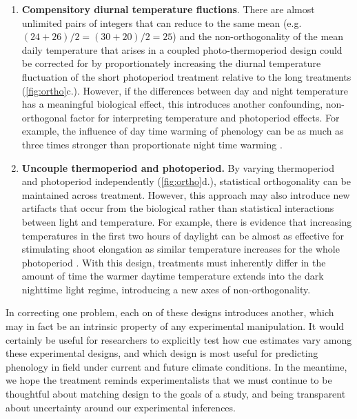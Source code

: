 \documentclass[11pt]{article}
\begin{document}
{\begin{enumerate}
\item \textbf{Compensitory diurnal temperature fluctions}. There are almost unlimited pairs of integers that can reduce to the same mean (e.g. $(24+26)/2 = (30+20)/2 = 25$) and the non-orthogonality of the mean daily temperature that arises in a coupled photo-thermoperiod design could be corrected for by proportionately increasing the diurnal temperature fluctuation of the short photoperiod treatment relative to the long treatments (\ref{fig:ortho}c.). However, if the differences between day and night temperature has a meaningful biological effect, this introduces another confounding, non-orthogonal factor for interpreting temperature and photoperiod effects. For example, the influence of day time warming of phenology can be as much as three times stronger than proportionate night time warming \citep{Rossi2017,Meng:2020ui}.

\item \textbf{Uncouple thermoperiod and photoperiod.} By varying thermoperiod and photoperiod independently (\ref{fig:ortho}d.), statistical orthogonality can be maintained across treatment. However, this approach may also introduce new artifacts that occur from the biological rather than statistical interactions between light and temperature. For example, there is evidence that increasing temperatures in the first two hours of daylight can be almost as effective for stimulating shoot elongation as similar temperature increases for the whole photoperiod \citep{Erwin1998}. With this design, treatments must inherently differ in the amount of time the warmer daytime temperature extends into the dark nighttime light regime, introducing a new axes of non-orthogonality.
\end{enumerate}

In correcting one problem, each on of these designs introduces another, which may in fact be an intrinsic property of any experimental manipulation. It would certainly be useful for researchers to explicitly test how cue estimates vary among these experimental designs, and which design is most useful for predicting phenology in field under current and future climate conditions. In the meantime, we hope the treatment reminds experimentalists that we must continue to be thoughtful about matching design to the goals of a study, and being transparent about uncertainty around our experimental inferences.






}
\end{document}
